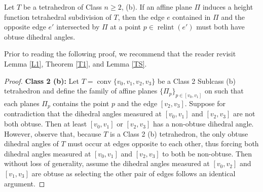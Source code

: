 \documentclass{mainresearch}
\begin{document}
\begin{thm}\label{UNIQ}
	Let $T$ be a tetrahedron of Class $n \ge 2$, (b). If an affine plane $\Pi$ induces a height function tetrahedral subdivision of $T$, then the edge $e$ contained in $\Pi$ and the opposite edge $e'$ intersected by $\Pi$ at a point $p \in \operatorname{relint}(e')$ must both have obtuse dihedral angles.
\end{thm}

Prior to reading the following proof, we recommend that the reader revisit Lemma \ref{L1}, Theorem \ref{T1}, and Lemma \ref{TS}. 

\begin{proof}
	
	\textbf{Class 2 (b):} Let $T=\operatorname{conv}\{v_0,v_1,v_2,v_3\}$ be a Class 2 Sublcass (b) tetrahedron and define the family of affine planes $\{\Pi_p\}_{p \in [v_0,v_1]}$ on such that each planes $\Pi_p$ contains the point $p$ and the edge $[v_2,v_3]$. Suppose for contradiction that the dihedral angles measured at $[v_0,v_1]$ and $[v_2,v_3]$ are not both obtuse. Then at least $[v_0,v_1]$ or $[v_2,v_3]$ has a non-obtuse dihedral angle. However, observe that, because $T$ is a Class 2 (b) tetrahedron, the only obtuse dihedral angles of $T$ must occur at edges opposite to each other, thus forcing both dihedral angles measured at $[v_0,v_1]$ and $[v_2,v_3]$ to both be non-obtuse. Then without loss of generality, assume the dihedral angles measured at $[v_0,v_2]$ and $[v_1,v_3]$ are obtuse as selecting the other pair of edges follows an identical argument. 
	

\end{proof}
\end{document}
